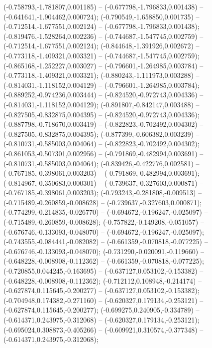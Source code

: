  (-0.758793,-1.781807,0.001185) -- (-0.677798,-1.796833,0.001438) -- (-0.641641,-1.904462,0.000724);
 (-0.790549,-1.658850,0.001735) -- (-0.712514,-1.677551,0.002124) -- (-0.677798,-1.796833,0.001438);
 (-0.819476,-1.528264,0.002236) -- (-0.744687,-1.547745,0.002759) -- (-0.712514,-1.677551,0.002124);
 (-0.844648,-1.391926,0.002672) -- (-0.773118,-1.409321,0.003321) -- (-0.744687,-1.547745,0.002759);
 (-0.865168,-1.252227,0.003027) -- (-0.796601,-1.264985,0.003784) -- (-0.773118,-1.409321,0.003321);
 (-0.880243,-1.111973,0.003288) -- (-0.814031,-1.118152,0.004129) -- (-0.796601,-1.264985,0.003784);
 (-0.889252,-0.974236,0.003444) -- (-0.824520,-0.972743,0.004336) -- (-0.814031,-1.118152,0.004129);
 (-0.891807,-0.842147,0.003488) -- (-0.827505,-0.832875,0.004395) -- (-0.824520,-0.972743,0.004336);
 (-0.887798,-0.718670,0.003419) -- (-0.822823,-0.702492,0.004302) -- (-0.827505,-0.832875,0.004395);
 (-0.877399,-0.606382,0.003239) -- (-0.810731,-0.585003,0.004064) -- (-0.822823,-0.702492,0.004302);
 (-0.861053,-0.507301,0.002956) -- (-0.791869,-0.482994,0.003691) -- (-0.810731,-0.585003,0.004064);
 (-0.839426,-0.422776,0.002581) -- (-0.767185,-0.398061,0.003203) -- (-0.791869,-0.482994,0.003691);
 (-0.814967,-0.350683,0.000301) -- (-0.739637,-0.327603,0.000871) -- (-0.767185,-0.398061,0.003203);
 (-0.793243,-0.281808,-0.009513) -- (-0.715489,-0.260859,-0.008628) -- (-0.739637,-0.327603,0.000871);
 (-0.774299,-0.214835,-0.026770) -- (-0.694672,-0.196247,-0.025097) -- (-0.715489,-0.260859,-0.008628);
 (-0.757822,-0.149208,-0.051057) -- (-0.676746,-0.133093,-0.048070) -- (-0.694672,-0.196247,-0.025097);
 (-0.743555,-0.084441,-0.082082) -- (-0.661359,-0.070818,-0.077225) -- (-0.676746,-0.133093,-0.048070);
 (-0.731290,-0.020091,-0.119660) -- (-0.648228,-0.008908,-0.112362) -- (-0.661359,-0.070818,-0.077225);
 (-0.720855,0.044245,-0.163695) -- (-0.637127,0.053102,-0.153382) -- (-0.648228,-0.008908,-0.112362);
 (-0.712112,0.108948,-0.214174) -- (-0.627874,0.115645,-0.200277) -- (-0.637127,0.053102,-0.153382);
 (-0.704948,0.174382,-0.271160) -- (-0.620327,0.179134,-0.253121) -- (-0.627874,0.115645,-0.200277);
 (-0.699275,0.240905,-0.334789) -- (-0.614371,0.243975,-0.312068) -- (-0.620327,0.179134,-0.253121);
 (-0.695024,0.308873,-0.405266) -- (-0.609921,0.310574,-0.377348) -- (-0.614371,0.243975,-0.312068);
